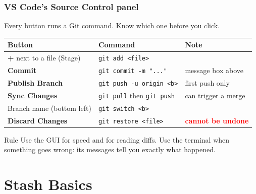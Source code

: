 \documentclass[aspectratio=169,10pt,compress]{beamer}
\newcommand{\cmd}[1]{\texttt{\color{gitred}#1}}
\begin{document}
\begin{frame}[t,fragile] \frametitle{VS Code's Source Control panel}
  Every button runs a Git command. Know which one before you click.

  \vspace{0.5em}
  \small
  \begin{tabular}{@{}L{0.33\textwidth}L{0.33\textwidth}L{0.28\textwidth}@{}}
    \toprule
    \textbf{Button} & \textbf{Command} & \textbf{Note} \\
    \midrule
    \textbf{+} next to a file (Stage) & \cmd{git add <file>} & \\
    \textbf{Commit} & \cmd{git commit -m "..."} & message box above \\
    \textbf{Publish Branch} & \cmd{git push -u origin <b>} & first push only \\
    \textbf{Sync Changes} & \cmd{git pull} then \cmd{git push} & can trigger a merge \\
    Branch name (bottom left) & \cmd{git switch <b>} & \\
    \textbf{Discard Changes} & \cmd{git restore <file>} & \textcolor{red}{\textbf{cannot be undone}} \\
    \bottomrule
  \end{tabular}

  \vspace{0.8em}
  \normalsize
  \begin{block}{Rule}
    Use the GUI for speed and for reading diffs. Use the terminal when something
    goes wrong: its messages tell you exactly what happened.
  \end{block}
\end{frame}

\section[Stash]{Stash Basics}
\end{document}
